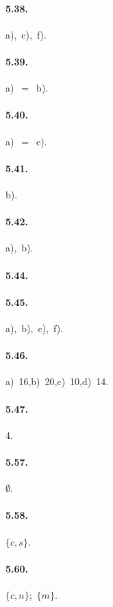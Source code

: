 \begin{multicols}{2}
\paragraph{5.38.} a),~c),~f).

\paragraph{5.39.} a)~$=$~b).

\paragraph{5.40.} a)~$=$~c).

\paragraph{5.41.} b).

\paragraph{5.42.} a),~b).

\paragraph{5.44.} \boxB\quad\boxC\quad\boxD

\paragraph{5.45.} a),~b),~c),~f).

\paragraph{5.46.} a)~16,\quad b)~20,\quad c)~10,\quad d)~14.

\paragraph{5.47.} 4.

\paragraph{5.57.} $\emptyset$.

\paragraph{5.58.} $\{c,s\}$.

\paragraph{5.60.} $\{c,n\}$;~$\{m\}$.


\end{multicols}
